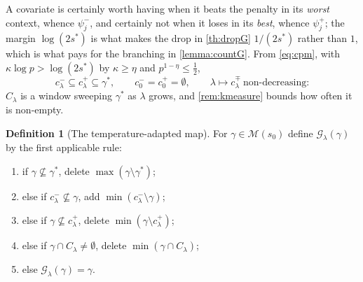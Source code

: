 \documentclass[aos]{imsart}
\theoremstyle{plain}
\theoremstyle{definition}
\newtheorem{definition}{Definition}[section]
\begin{document}
    A covariate is certainly worth having when it beats the penalty in its
    \emph{worst} context, whence $\psi_j^{-}$, and certainly not when it
    loses in its \emph{best}, whence $\psi_j^{+}$; the margin
    $\log(2s^{\ast})$ is what makes the drop in \cref{th:dropG}
    $1/(2s^{\ast})$ rather than $1$, which is what pays for the branching in
    \cref{lemma:countG}. From \eqref{eq:cpm}, with
    $\kappa\log p>\log(2s^{\ast})$ by $\kappa\geq\eta$ and
    $p^{1-\eta}\leq\tfrac12$,
    \begin{equation}
        \label{eq:cpmmono}
        c^{-}_\lambda\subseteq c^{+}_\lambda\subseteq\gamma^{\ast},
        \qquad
        c^{-}_0=c^{+}_0=\emptyset,
        \qquad
        \lambda\mapsto c^{\mp}_\lambda\ \text{non-decreasing:}
    \end{equation}
    $C_\lambda$ is a window sweeping $\gamma^{\ast}$ as $\lambda$ grows, and
    \cref{rem:kmeasure} bounds how often it is non-empty.

    \begin{definition}[The temperature-adapted map]
        \label{def:Glambda}
        For $\gamma\in\mathscr{M}(s_0)$ define $\mathcal{G}_\lambda(\gamma)$
        by the first applicable rule:
        \begin{enumerate}[label=(H\arabic*),leftmargin=3.4em]
            \item\label{H:null} if $\gamma\not\subseteq\gamma^{\ast}$, delete
            $\max(\gamma\setminus\gamma^{\ast})$;
            \item\label{H:add} else if $c^{-}_\lambda\not\subseteq\gamma$,
            add $\min(c^{-}_\lambda\setminus\gamma)$;
            \item\label{H:del} else if $\gamma\not\subseteq c^{+}_\lambda$,
            delete $\min(\gamma\setminus c^{+}_\lambda)$;
            \item\label{H:undec} else if $\gamma\cap C_\lambda\neq\emptyset$,
            delete $\min(\gamma\cap C_\lambda)$;
            \item\label{H:fix} else $\mathcal{G}_\lambda(\gamma)=\gamma$.
        \end{enumerate}
    \end{definition}
\end{document}
